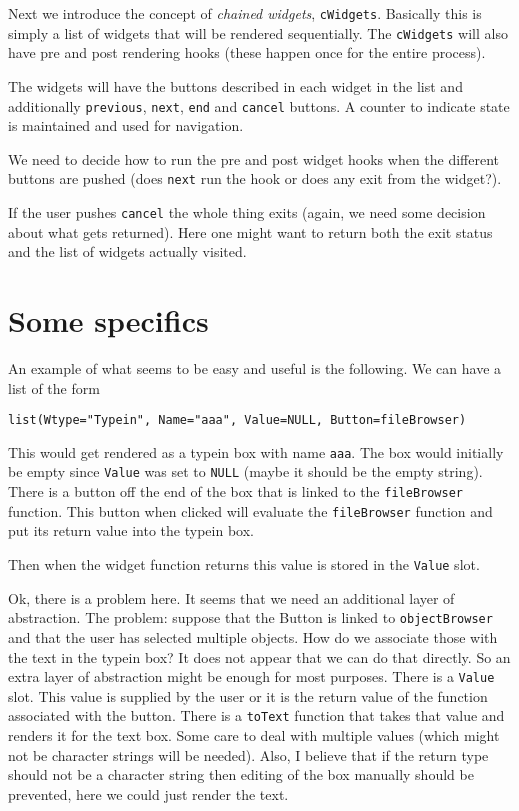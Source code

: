\documentclass{article}
\begin{document}
Next we introduce the concept of {\em chained widgets},
\verb+cWidgets+. 
Basically this is simply a list of widgets that will be rendered
sequentially. 
The \verb+cWidgets+ will also have pre and post rendering hooks (these
happen once for the entire process).

The widgets will have the buttons described in each widget in the list
and additionally \verb+previous+, \verb+next+, \verb+end+ and
\verb+cancel+ buttons.
A counter to indicate state is maintained and used for navigation.

We need to decide how to run the pre and post widget hooks when the
different buttons are pushed (does \verb+next+ run the hook or does
any exit from the widget?).

If the user pushes \verb+cancel+ the whole thing exits (again, we need
some decision about what gets returned). Here one might want to return
both the exit status and the list of widgets actually visited.


\section*{Some specifics}

An example of what seems to be easy and useful is the following.
We can have a list of the form
\begin{verbatim}
list(Wtype="Typein", Name="aaa", Value=NULL, Button=fileBrowser)
\end{verbatim}
This would get rendered as a typein box with name \verb+aaa+. The box
would initially be empty since \verb+Value+ was set to \verb+NULL+
(maybe it should be the empty string). There is a button off the end
of the box that is linked to the \verb+fileBrowser+ function.
This button when clicked will evaluate the \verb+fileBrowser+ function
and put its return value into the typein box.

Then when the widget function returns this value is stored in the
\verb+Value+ slot.

Ok, there is a problem here. It seems that we need an additional layer
of abstraction.
The problem: suppose that the Button is linked to \verb+objectBrowser+
and that the user has selected multiple objects. How do we associate
those with the text in the typein box?
It does not appear that we can do that directly.
So an extra layer of abstraction might be enough for most purposes.
There is a \verb+Value+ slot. This value is supplied by the user or 
it is the return value of the function associated with the button.
There is a \verb+toText+ function that takes that value and renders it
for the text box.
Some care to deal with multiple values (which might not be character
strings will be needed).
Also, I believe that if the return type should not be a character
string then editing of the box manually should be prevented, here we
could just render the text.
\end{document}
